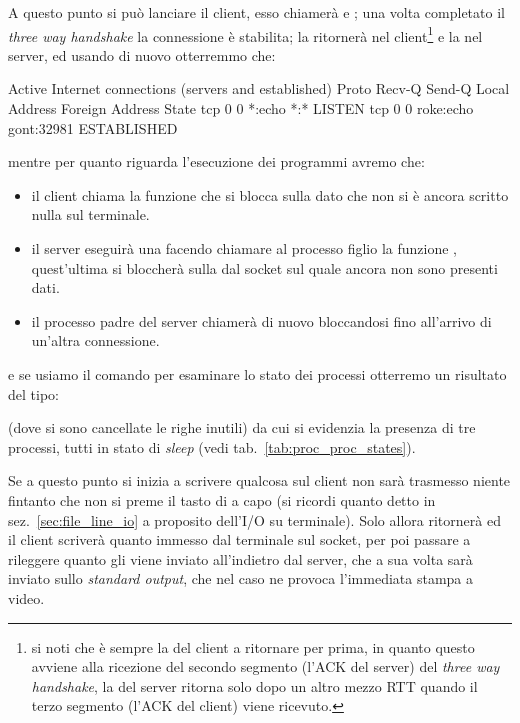 A questo punto si può lanciare il client, esso chiamerà  e
; una volta completato il \textit{three way handshake} la
connessione è stabilita; la  ritornerà nel client\footnote{si
  noti che è sempre la  del client a ritornare per prima, in
  quanto questo avviene alla ricezione del secondo segmento (l'ACK del server)
  del \textit{three way handshake}, la  del server ritorna solo
  dopo un altro mezzo RTT quando il terzo segmento (l'ACK del client) viene
  ricevuto.}  e la  nel server, ed usando di nuovo 
otterremmo che:
\begin{Terminal}
Active Internet connections (servers and established)
Proto Recv-Q Send-Q Local Address           Foreign Address         State
tcp        0      0 *:echo                  *:*                     LISTEN
tcp        0      0 roke:echo               gont:32981              ESTABLISHED
\end{Terminal}
mentre per quanto riguarda l'esecuzione dei programmi avremo che:
\begin{itemize}
\item il client chiama la funzione  che si blocca sulla
   dato che non si è ancora scritto nulla sul terminale.
\item il server eseguirà una  facendo chiamare al processo figlio
  la funzione , quest'ultima si bloccherà sulla 
  dal socket sul quale ancora non sono presenti dati.
\item il processo padre del server chiamerà di nuovo 
  bloccandosi fino all'arrivo di un'altra connessione.
\end{itemize}
e se usiamo il comando  per esaminare lo stato dei processi otterremo
un risultato del tipo:
(dove si sono cancellate le righe inutili) da cui si evidenzia la presenza di
tre processi, tutti in stato di \textit{sleep} (vedi
tab.~\ref{tab:proc_proc_states}).

Se a questo punto si inizia a scrivere qualcosa sul client non sarà trasmesso
niente fintanto che non si preme il tasto di a capo (si ricordi quanto detto
in sez.~\ref{sec:file_line_io} a proposito dell'I/O su terminale).  Solo
allora  ritornerà ed il client scriverà quanto immesso dal
terminale sul socket, per poi passare a rileggere quanto gli viene inviato
all'indietro dal server, che a sua volta sarà inviato sullo \textit{standard
  output}, che nel caso ne provoca l'immediata stampa a video.


